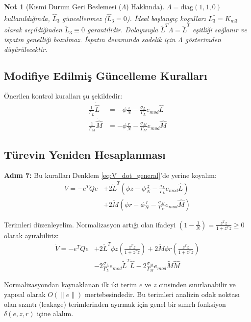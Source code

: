 \documentclass[12pt,a4paper]{article}
\newtheorem{remark}{Not}
\begin{document}
\begin{remark}[Kısmi Durum Geri Beslemesi ($\Lambda$) Hakkında]
$\Lambda = \text{diag}(1,1,0)$ kullanıldığında, $\hat{L}_3$ güncellenmez ($\dot{\hat{L}}_3 = 0$). İdeal başlangıç koşulları $L_3^* = K_{m3}$ olarak seçildiğinden $\tilde{L}_3 \equiv 0$ garantilidir. Dolayısıyla $\tilde{L}^T \Lambda = \tilde{L}^T$ eşitliği sağlanır ve ispatın genelliği bozulmaz. İspatın devamında sadelik için $\Lambda$ gösterimden düşürülecektir.
\end{remark}

\subsection{Modifiye Edilmiş Güncelleme Kuralları}
Önerilen kontrol kuralları şu şekildedir:
\begin{align}
    \frac{1}{\Gamma_L} \dot{\hat{L}} &= -\phi \frac{z}{N} - \frac{\sigma_L}{\Gamma_L} e_{mod} \hat{L} \\
    \frac{1}{\Gamma_M} \dot{\hat{M}} &= -\phi \frac{r}{N} - \frac{\sigma_M}{\Gamma_M} e_{mod} \hat{M}
\end{align}

\subsection{Türevin Yeniden Hesaplanması}
\textbf{Adım 7:} Bu kuralları Denklem \ref{eq:V_dot_general}'de yerine koyalım:
\begin{align}
    \dot{V} = -e^T Q e &+ 2 \tilde{L}^T \left( \phi z - \phi \frac{z}{N} - \frac{\sigma_L}{\Gamma_L} e_{mod} \hat{L} \right) \nonumber \\
    &+ 2 \tilde{M} \left( \phi r - \phi \frac{r}{N} - \frac{\sigma_M}{\Gamma_M} e_{mod} \hat{M} \right)
\end{align}

Terimleri düzenleyelim. Normalizasyon artığı olan ifadeyi $\left(1 - \frac{1}{N}\right) = \frac{z^T z}{1+z^T z} \ge 0$ olarak ayırabiliriz:
\begin{align}
    \dot{V} = -e^T Q e &+ 2 \tilde{L}^T \phi z \left( \frac{z^T z}{1+z^T z} \right) + 2 \tilde{M} \phi r \left( \frac{z^T z}{1+z^T z} \right) \nonumber \\
    &- 2 \frac{\sigma_L}{\Gamma_L} e_{mod} \tilde{L}^T \hat{L} - 2 \frac{\sigma_M}{\Gamma_M} e_{mod} \tilde{M} \hat{M}
\end{align}

Normalizasyondan kaynaklanan ilk iki terim $e$ ve $z$ cinsinden sınırlanabilir ve yapısal olarak $O(\|e\|)$ mertebesindedir. Bu terimleri analizin odak noktası olan sızıntı (leakage) terimlerinden ayırmak için genel bir sınırlı fonksiyon $\delta(e, z, r)$ içine alalım.
\end{document}
